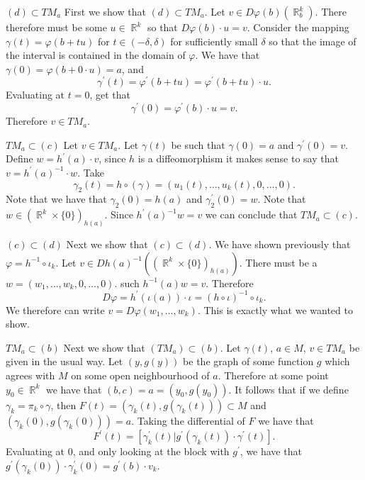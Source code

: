 \documentclass[letterpaper]{article}
\DeclareMathOperator{\R}{\mathbb{R}}
\begin{document}
 
\noindent
\begin{description}
\item{$(d) \subset TM_a$} \newline 
First we show that $(d) \subset TM_a$. Let $v\in D\varphi(b) ( \R_b^k).$ There therefore must be some $u\in \R^k$ so that $D \varphi(b)\cdot u = v$. 
Consider the mapping $\gamma(t)=\varphi(b+ tu)$ for $t\in (-\delta, \delta)$ for sufficiently small $\delta$ so that the image of the interval is contained in the domain of $\varphi$. 
We have that $\gamma(0) = \varphi(b+0\cdot u) = a$, and $$\gamma^\prime(t) = \varphi^\prime(b+tu) = \varphi^\prime(b+tu) \cdot u.$$ Evaluating at $t=0$, 
get that $$\gamma^\prime(0) = \varphi^\prime(b)\cdot u = v.$$ Therefore $v\in TM_a$. 
\item{$TM_a \subset (c)$} \newline
Let $v\in TM_a$. Let $\gamma(t)$ be such that $\gamma(0) = a$ and $\gamma^\prime(0) = v$. 
Define $w = h^\prime(a)\cdot v$, since $h$ is a diffeomorphism it makes sense to say that $v = h^\prime(a)^{-1}\cdot w$. Take $$\gamma_2(t) = h\circ(\gamma) = (u_1(t), \dots , u_k(t), 0 ,\dots ,0). $$ 
Note that we have that $\gamma_2(0) =h(a) $ and $\gamma_2^\prime(0) =w$. Note that $w\in (\R^k\times \{0\})_{h(a)}$. Since $h^\prime(a)^{-1}w=v$ we can conclude that $TM_a\subset (c)$. 
\item{$(c) \subset (d)$}\newline
Next we show that $(c) \subset (d)$. We have shown previously that $\varphi = h^{-1} \circ \iota_k$. Let $v \in Dh(a)^{-1}((\R^k\times \{0\})_{h(a)}).$ There must be a $w = (w_1, \dots , w_k , 0, \dots ,0).$ such $h^{-1}(a)w = v$. 
Therefore $$D\varphi = h^\prime(\iota(a)) \cdot \iota = (h\circ \iota)^{-1}\circ \iota_k.$$ 
We therefore can write $v = D\varphi (w_1, \dots , w_k)$. This is exactly what we wanted to show. 
\item{$TM_a \subset (b)$} \newline 
Next we show that $(TM_a) \subset (b)$. Let $\gamma(t)$, $a\in M$, $v\in TM_a$ be given in the usual way. Let $(y,g(y))$ be the graph of some function $g$ which agrees with $M$ on some open neighbourhood of $a$. 
Therefore at some point $y_0\in \R^k$ we have that $(b,c)=a =(y_0,g(y_0)).$ It follows that if we define $\gamma_k = \pi_{k}\circ \gamma$, then $F(t) = (\gamma_k(t), g(\gamma_k(t)))\subset M$ and $(\gamma_k(0), g(\gamma_k(0))) = a$.
Taking the differential of $F$ we have that $$F^\prime(t) = [\gamma_k^\prime (t) | g^\prime(\gamma_k(t))\cdot \gamma^\prime(t)].$$ Evaluating at $0$, and only looking at the block with $g^\prime$, we have that $g^\prime(\gamma_k(0))\cdot \gamma_k^\prime(0)= g^\prime(b)\cdot v_k$. 

\end{description}
\end{document}
